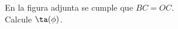 En la figura adjunta se cumple que $ BC=OC $.\\ Calcule $ \ta (\phi) $.
\begin{center}
\end{center}
